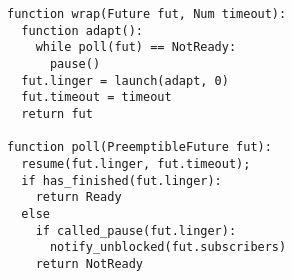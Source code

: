\begin{figure}
\begin{lstlisting}[label=lst:future,caption=Futures adapter type (pseudocode)]
function wrap(Future fut, Num timeout):
  function adapt():
    while poll(fut) == NotReady:
      pause()
  fut.linger = launch(adapt, 0)
  fut.timeout = timeout
  return fut

function poll(PreemptibleFuture fut):
  resume(fut.linger, fut.timeout);
  if has_finished(fut.linger):
    return Ready
  else
    if called_pause(fut.linger):
      notify_unblocked(fut.subscribers)
    return NotReady
\end{lstlisting}
\end{figure}
